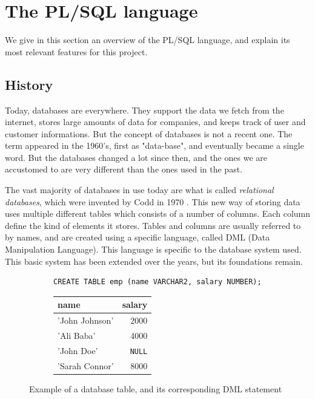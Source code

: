 \documentclass[twoside,11pt,a4paper]{article}
\newcommand{\pls}[1]{\small\texttt{#1}\normalsize}
\newcommand{\plsnull}{\pls{NULL}}
\newcommand{\startsection}[1]{
	\cleardoublepage
	\section{#1}
	\thispagestyle{basic}
}
\begin{document}
\startsection{The PL/SQL language}

We give in this section an overview of the PL/SQL language, and explain its most relevant features for this project.

\subsection{History}

Today, databases are everywhere. They support the data we fetch from the internet, stores large amounts of data for companies, and keeps track of user and customer informations. But the concept of databases is not a recent one. The term appeared in the 1960's, first as "data-base", and eventually became a single word. But the databases changed a lot since then, and the ones we are accustomed to are very different than the ones used in the past.

The vast majority of databases in use today are what is called \textit{relational databases}, which were invented by Codd in 1970 \cite{codd70}. This new way of storing data uses multiple different tables which consists of a number of columns. Each column define the kind of elements it stores. Tables and columns are usually referred to by names, and are created using a specific language, called DML (Data Manipulation Language). This language is specific to the database system used. This basic system has been extended over the years, but its foundations remain.

\begin{figure}[hb]
	\centering
	
	\begin{subfigure}[h]{\textwidth}
		\centering
		\begin{lstlisting}[style=SQL]
CREATE TABLE emp (name VARCHAR2, salary NUMBER);
		\end{lstlisting}
	\end{subfigure}
	
	
	\begin{subfigure}[h]{\textwidth}
		\centering
		\begin{tabular}{| l | r |}
			\hline
			name & salary \\
			\hline
			'John Johnson' & 2000 \\
			'Ali Baba' & 4000 \\
			'John Doe' & \plsnull{} \\
			'Sarah Connor' & 8000 \\
			\hline
		\end{tabular}
	\end{subfigure}

	\caption{Example of a database table, and its corresponding DML statement}
	
\end{figure}
\end{document}

